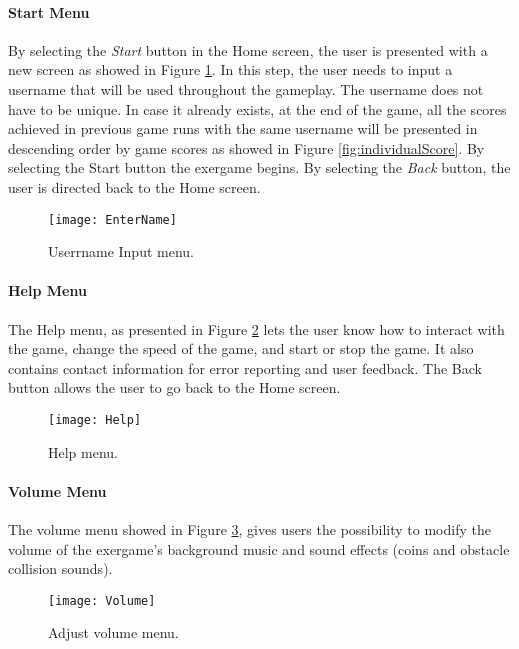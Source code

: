 \paragraph{Start Menu}
By selecting the \textit{Start} button in the Home screen, the user is presented with a new screen as showed in Figure \ref{fig:userinfo}. In this step, the user needs to input a username that will be used throughout the gameplay. The username does not have to be unique. In case it already exists, at the end of the game, all the scores achieved in previous game runs with the same username will be presented in descending order by game scores as showed in Figure \ref{fig:individualScore}. By selecting the Start button the exergame begins. By selecting the \textit{Back} button, the user is directed back to the Home screen.\\
\begin{figure}[h]
    \centering
    \texttt{[image: EnterName]}
    \caption{Userrname Input menu.}
    \label{fig:userinfo}
\end{figure}
\paragraph{Help Menu}
The Help menu, as presented in Figure \ref{fig:help} lets the user know how to interact with the game, change the speed of the game, and start or stop the game. It also contains contact information for error reporting and user feedback. The Back button allows the user to go back to the Home screen.
\begin{figure}[h]
    \centering
    \texttt{[image: Help]}
    \caption{Help menu.}
    \label{fig:help}
\end{figure}
\paragraph{Volume Menu}
The volume menu showed in Figure \ref{fig:volume}, gives users the possibility to modify the volume of the exergame's background music and sound effects (coins and obstacle collision sounds).\\
\begin{figure}[h]
    \centering
    \texttt{[image: Volume]}
    \caption{Adjust volume menu.}
    \label{fig:volume}
\end{figure}
